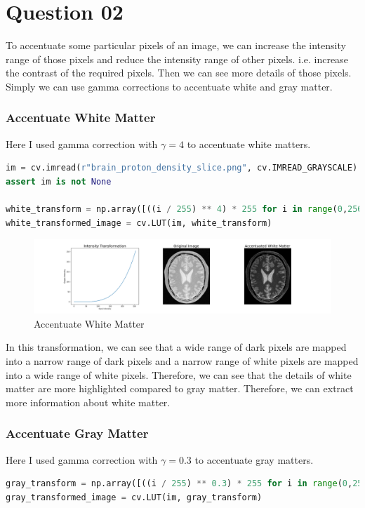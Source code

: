 \documentclass[a4paper]{article}
\begin{document}
\section*{Question 02}
To accentuate some particular pixels of an image, we can increase the
 intensity range of those pixels and reduce the intensity range of other
  pixels. i.e. increase the contrast of the required pixels. Then we can
   see more details of those pixels. Simply we can use gamma corrections
    to accentuate white and gray matter.
\subsubsection*{Accentuate White Matter}
Here I used gamma correction with $\gamma = 4$ to accentuate white matters.
\begin{lstlisting}[language=python, caption=Accentuate White Matter, label=q2c]
im = cv.imread(r"brain_proton_density_slice.png", cv.IMREAD_GRAYSCALE)
assert im is not None

white_transform = np.array([((i / 255) ** 4) * 255 for i in range(0,256)],dtype=np.uint8)
white_transformed_image = cv.LUT(im, white_transform)
    \end{lstlisting}
\begin{figure}[!htb]
    \centering
    \hspace*{-2cm}
    \includegraphics[width=1.2\textwidth]{../q2.png}
    \caption{Accentuate White Matter}
    \label{figq2}
\end{figure}
In this transformation, we can see that a wide range of dark pixels
 are mapped into a narrow range of dark pixels and a narrow range of
  white pixels are mapped into a wide range of white pixels. Therefore,
   we can see that the details of white matter are more highlighted
    compared to gray matter. Therefore, we can extract more information about
     white matter.
\subsubsection*{Accentuate Gray Matter}
Here I used gamma correction with $\gamma = 0.3$ to accentuate gray matters.
\begin{lstlisting}[language=python, caption=Accentuate Gray Matter, label=q22c]
gray_transform = np.array([((i / 255) ** 0.3) * 255 for i in range(0,256)],dtype=np.uint8)
gray_transformed_image = cv.LUT(im, gray_transform)
\end{lstlisting}
\end{document}
